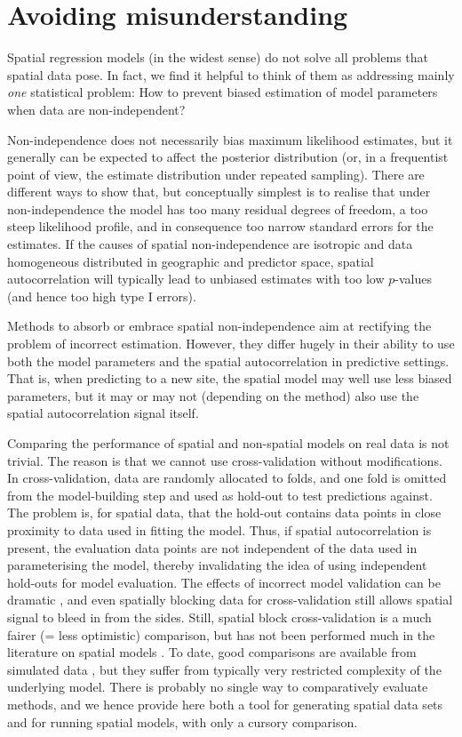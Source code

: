 \documentclass[11pt]{article}
\begin{document}
\section{Avoiding misunderstanding}
Spatial regression models (in the widest sense) do not solve all problems that spatial data pose. In fact, we find it helpful to think of them as addressing mainly \emph{one} statistical problem: How to prevent biased estimation of model parameters when data are non-independent?

Non-independence does not necessarily bias maximum likelihood estimates, but it generally can be expected to affect the posterior distribution (or, in a frequentist point of view, the estimate distribution under repeated sampling). There are different ways to show that, but conceptually simplest is to realise that under non-independence the model has too many residual degrees of freedom, a too steep likelihood profile, and in consequence too narrow standard errors for the estimates. If the causes of spatial non-independence are isotropic and data homogeneous distributed in geographic and predictor space, spatial autocorrelation will typically lead to unbiased estimates with too low $p$-values (and hence too high type I errors).

Methods to absorb or embrace spatial non-independence aim at rectifying the problem of incorrect estimation. However, they differ hugely in their ability to use both the model parameters and the spatial autocorrelation in predictive settings. That is, when predicting to a new site, the spatial model may well use less biased parameters, but it may or may not (depending on the method) also use the spatial autocorrelation signal itself.

Comparing the performance of spatial and non-spatial models on real data is not trivial. The reason is that we cannot use cross-validation without modifications. In cross-validation, data are randomly allocated to folds, and one fold is omitted from the model-building step and used as hold-out to test predictions against. %
The problem is, for spatial data, that the hold-out contains data points in close proximity to data used in fitting the model. Thus, if spatial autocorrelation is present, the evaluation data points are not independent of the data used in parameterising the model, thereby invalidating the idea of using independent hold-outs for model evaluation. The effects of incorrect model validation can be dramatic \citep{Bahn2013}, and even spatially blocking data for cross-validation still allows spatial signal to bleed in from the sides. Still, spatial block cross-validation is a much fairer (= less optimistic) comparison, but has not been performed much in the literature on spatial models \citep[e.g.][]{Renner2015}. To date, good comparisons are available from simulated data \citep{Beale2013}, but they suffer from typically very restricted complexity of the underlying model. There is probably no single way to comparatively evaluate methods, and we hence provide here both a tool for generating spatial data sets and for running spatial models, with only a cursory comparison.
\end{document}
